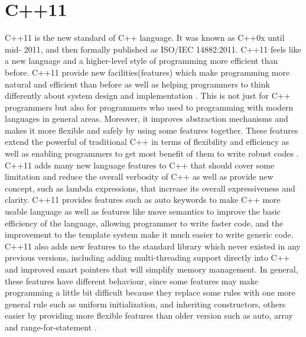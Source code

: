 \documentclass[12pt,a4paper]{report}
\begin{document}
\section{C++11}
\label{section: C++11}
C++11 is the new standard of C++ language. It was known as C++0x until mid- 2011, and then formally published as ISO/IEC 14882:2011. C++11 feels like a new language and a higher-level style of programming more efficient than before\cite{ISO:2011:Cpplanguage}. 
\newline
C++11 provide new facilities(features) which make programming more natural and efficient than before as well as helping programmers to think differently about system design and implementation \cite{Stroustrup:2012:Cpp11}. This is not just for C++ programmers but also for programmers who used to programming with modern languages in general areas. Moreover, it improves abstraction mechanisms and makes it more flexible and safely by using some features together. These features extend the powerful of traditional C++ in terms of flexibility and efficiency as well as enabling programmers to get most benefit of them to write robust codes \cite{ISO:2011:Cpplanguage}.
\newline
C++11 adds many new language features to C++ that should cover some limitation and reduce the overall verbosity of C++ as well as provide new concept, such as lambda expressions, that increase its overall expressiveness and clarity.
\newline
C++11 provides features such as auto keywords to make C++ more usable language as well as features like move semantics to improve the basic efficiency of the language, allowing programmer to write faster code, and the improvement to the template system make it much easier to write generic code\cite{Stroustrup:2005:Cpp}.
\newline
C++11 also adds new features to the standard library which never existed in any previous versions, including adding multi-threading support directly into C++ and improved smart pointers that will simplify memory management. 
\newline
In general, these features have different behaviour, since some features may make programming a little bit difficult because they replace some rules with one more general rule such as uniform initialization,  and inheriting constructors, others easier by providing more flexible features than older version such as auto, array and range-for-statement \cite{Stroustrup:2012:Cpp11}.

	
\end{document}
